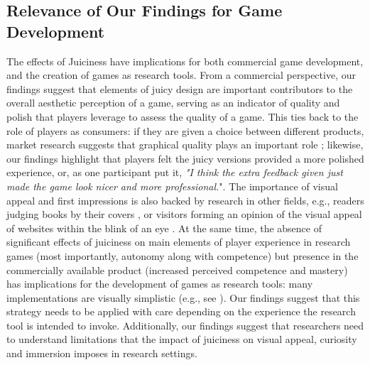 \documentclass{sigchi}
\begin{document}
\subsection{Relevance of Our Findings for Game Development}
The effects of Juiciness have implications for both commercial game development, and the creation of games as research tools. From a commercial perspective, our findings suggest that elements of juicy design are important contributors to the overall aesthetic perception of a game, serving as an indicator of quality and polish that players leverage to assess the quality of a game. This ties back to the role of players as consumers: if they are given a choice between different products, market research suggests that graphical quality plays an important role \cite{usher_2014}; likewise, our findings highlight that players felt the juicy versions provided a more polished experience, or, as one participant put it, \textit{"I think the extra feedback given just made the game look nicer and more professional.}". The importance of visual appeal and first impressions is also backed by research in other fields, e.g., readers judging books by their covers \cite{yampbell2005judging}, or visitors forming an opinion of the visual appeal of websites within the blink of an eye \cite{lindgaard2006attention}. At the same time, the absence of significant effects of juiciness on main elements of player experience in research games (most importantly, autonomy along with competence) but presence in the commercially available product (increased perceived competence and mastery) has implications for the development of games as research tools: many implementations are visually simplistic (e.g., see \cite{brezinka2008treasure, laneau2005flexible, peddycord2017using}). Our findings suggest that this strategy needs to be applied with care depending on the experience the research tool is intended to invoke. Additionally, our findings suggest that researchers need to understand limitations that the impact of juiciness on visual appeal, curiosity and immersion imposes in research settings.
\end{document}
